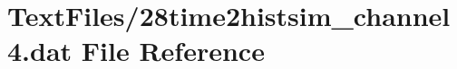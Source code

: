 \hypertarget{28time2histsim__channel4_8dat}{}\section{Text\+Files/28time2histsim\+\_\+channel4.dat File Reference}
\label{28time2histsim__channel4_8dat}
